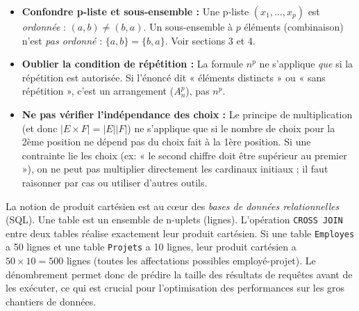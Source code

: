 \documentclass[11pt]{article}
\begin{document}
\begin{attention}
\begin{itemize}
    \item \textbf{Confondre p‑liste et sous-ensemble :} Une p‑liste $(x_1,\dots,x_p)$ est \emph{ordonnée} : $(a,b) \neq (b,a)$. Un sous-ensemble à $p$ éléments (combinaison) n'est \emph{pas ordonné} : $\{a,b\} = \{b,a\}$. Voir sections 3 et 4.
    \item \textbf{Oublier la condition de répétition :} La formule $n^p$ ne s'applique \emph{que} si la répétition est autorisée. Si l'énoncé dit « éléments distincts » ou « sans répétition », c'est un arrangement ($A_n^p$), pas $n^p$.
    \item \textbf{Ne pas vérifier l'indépendance des choix :} Le principe de multiplication (et donc $|E \times F| = |E||F|$) ne s'applique que si le nombre de choix pour la 2ème position ne dépend pas du choix fait à la 1ère position. Si une contrainte lie les choix (ex: « le second chiffre doit être supérieur au premier »), on ne peut pas multiplier directement les cardinaux initiaux ; il faut raisonner par cas ou utiliser d'autres outils.
\end{itemize}
\end{attention}

\begin{savaistu}
La notion de produit cartésien est au cœur des \emph{bases de données relationnelles} (SQL). Une table est un ensemble de n-uplets (lignes). L'opération \texttt{CROSS JOIN} entre deux tables réalise exactement leur produit cartésien. Si une table \texttt{Employes} a 50 lignes et une table \texttt{Projets} a 10 lignes, leur produit cartésien a $50 \times 10 = 500$ lignes (toutes les affectations possibles employé-projet). Le dénombrement permet donc de prédire la taille des résultats de requêtes avant de les exécuter, ce qui est crucial pour l'optimisation des performances sur les gros chantiers de données.
\end{savaistu}
\end{document}
